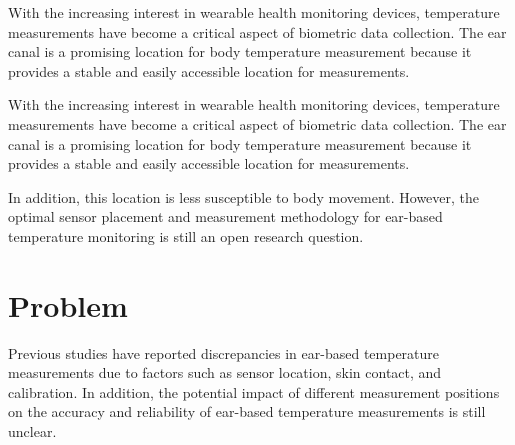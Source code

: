 With the increasing interest in wearable health monitoring devices, temperature measurements have become a critical aspect of biometric data collection. The ear canal is a promising location for body temperature measurement because it provides a stable and easily accessible location for measurements.

With the increasing interest in wearable health monitoring devices, temperature measurements have become a critical aspect of biometric data collection. The ear canal is a promising location for body temperature measurement because it provides a stable and easily accessible location for measurements. %

In addition, this location is less susceptible to body movement. However, the optimal sensor placement and measurement methodology for ear-based temperature monitoring is still an open research question. %


\section{Problem}
Previous studies have reported discrepancies in ear-based temperature measurements due to factors such as sensor location, skin contact, and calibration. In addition, the potential impact of different measurement positions on the accuracy and reliability of ear-based temperature measurements is still unclear.

